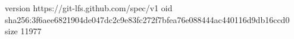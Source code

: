 version https://git-lfs.github.com/spec/v1
oid sha256:3f6aee6821904de047dc2c9e83fc272f7bfea76e088444ac440116d9db16ccd0
size 11977
